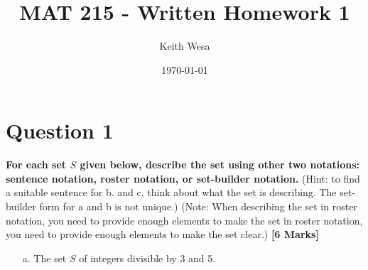 \documentclass{article}
\author{Keith Wesa}
\title{MAT 215 - Written Homework 1}
\date{\today}
\begin{document}
\section*{Question 1}
\textbf{For each set $S$ given below, describe the set using other two notations: 
sentence notation, roster notation, or set-builder notation.} (Hint: to find a suitable sentence
for b. and c, think about what the set is describing. The set-builder form for a and b is not unique.)
(Note: When describing the set in roster notation, you need to provide enough elements to make 
the set in roster notation, you need to provide enough elements to make the set clear.) \textbf{[6 Marks]}
\begin{itemize}
    \item[a.] The set $S$ of integers divisible by 3 and 5.
\end{itemize}
\end{document}
